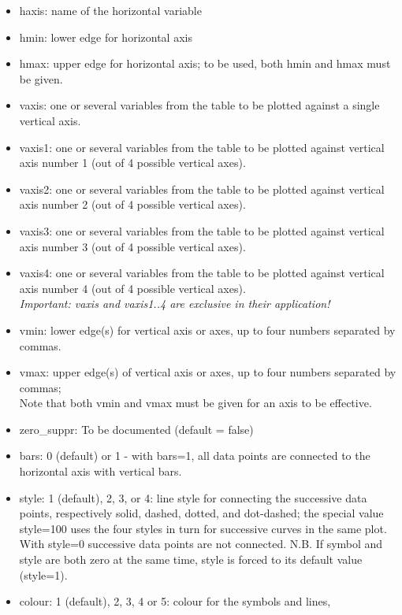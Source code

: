 \begin{itemize}
   \item haxis: name of the horizontal variable 
   \item hmin: lower edge for horizontal axis 
   \item hmax: upper edge for horizontal axis; to be used, both hmin and hmax
     must be given.   
   \item vaxis: one or several variables from the table to be plotted
     against a single vertical axis.   
   \item vaxis1: one or several variables from the table to be plotted
     against vertical axis number 1 (out of 4 possible vertical axes).  
   \item vaxis2: one or several variables from the table to be plotted
     against vertical axis number 2 (out of 4 possible vertical axes).  
   \item vaxis3: one or several variables from the table to be plotted
     against vertical axis number 3 (out of 4 possible vertical axes).  
   \item vaxis4: one or several variables from the table to be plotted
     against vertical axis number 4 (out of 4 possible vertical axes). \\ 
   \textit{Important: vaxis and vaxis{1..4} are exclusive in their
     application!} 
   \item vmin: lower edge(s) for vertical axis or axes, up to four
     numbers separated by commas.
   \item vmax: upper edge(s) of vertical axis or axes, up to four
     numbers separated by commas; \\
     Note that both vmin and vmax must be given for an axis to be effective.   
   \item zero\_suppr: To be documented (default = false)
   \item bars: 0 (default) or 1 - with bars=1, all data points
     are connected to the horizontal axis with vertical bars.   
   \item style: 1 (default), 2, 3, or 4: line style for connecting the
     successive data points, respectively solid, dashed, dotted, and dot-dashed; 
     the special value style=100 uses the four styles in turn for
     successive curves in the same plot. 
     With style=0 successive data points are not connected. 
     N.B. If symbol and style are both zero at the same time, style is
     forced to its default value (style=1).
   \item colour: 1 (default), 2, 3, 4 or 5: colour for the symbols and lines, 

\end{itemize}

